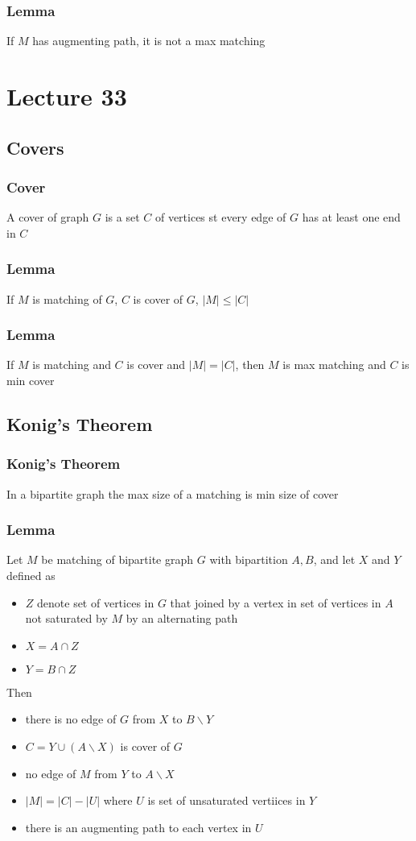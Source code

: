 \documentclass[11pt]{article}
\begin{document}
\subsubsection*{Lemma}
If $M$ has augmenting path, it is not a max matching 

\section{Lecture 33}
\subsection{Covers}
\subsubsection*{Cover}
A cover of graph $G$ is a set $C$ of vertices st every edge of $G$ has at least one end in $C$
\subsubsection*{Lemma}
If $M$ is matching of $G$, $C$ is cover of $G$, $|M|\leq |C|$
\subsubsection*{Lemma}
If $M$ is matching and $C$ is cover and $|M|=|C|$, then $M$ is max matching and $C$ is min cover 
\subsection{Konig's Theorem}
\subsubsection*{Konig's Theorem}
In a bipartite graph the max size of a matching is min size of cover 
\subsubsection*{Lemma}
Let $M$ be matching of bipartite graph $G$ with bipartition $A,B$, and let $X$ and $Y$ defined as 
\begin{itemize}
  \item $Z$ denote set of vertices in $G$ that joined by a vertex in set of vertices in $A$ not saturated by $M$ by an alternating path 
  \item $X=A\cap Z$
  \item $Y=B\cap Z$
\end{itemize}
Then
\begin{itemize}
  \item there is no edge of $G$ from $X$ to $B\backslash Y$
  \item $C=Y\cup(A\backslash X)$ is cover of $G$
  \item no edge of $M$ from $Y$ to $A\backslash X$
  \item $|M|=|C|-|U|$ where $U$ is set of unsaturated vertiices in $Y$
  \item there is an augmenting path to each vertex in $U$
\end{itemize}
\end{document}
